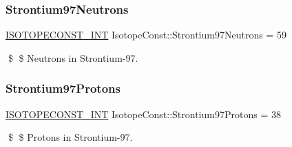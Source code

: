 \subsubsection{\texorpdfstring{Strontium97\+Neutrons}{Strontium97Neutrons}}
{\footnotesize\ttfamily \mbox{\hyperlink{group___isotope_const-_macros_ga5f18360b3e99483a35c32d789e62621c}{I\+S\+O\+T\+O\+P\+E\+C\+O\+N\+S\+T\+\_\+\+I\+NT}} Isotope\+Const\+::\+Strontium97\+Neutrons = 59}

\$ \$ Neutrons in Strontium-\/97. \mbox{\label{group___isotope_const-_strontium-_sr97_ga33401b48d93cbf0929560607f2c90413}} 
\subsubsection{\texorpdfstring{Strontium97\+Protons}{Strontium97Protons}}
{\footnotesize\ttfamily \mbox{\hyperlink{group___isotope_const-_macros_ga5f18360b3e99483a35c32d789e62621c}{I\+S\+O\+T\+O\+P\+E\+C\+O\+N\+S\+T\+\_\+\+I\+NT}} Isotope\+Const\+::\+Strontium97\+Protons = 38}

\$ \$ Protons in Strontium-\/97. 